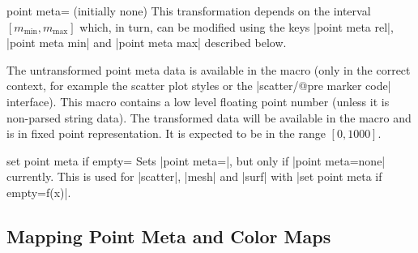 \begin{pgfplotskey}{point meta= (initially none)}
	This transformation depends on the interval $[m_{\text{min}},m_{\text{max}}]$ which, in turn, can be modified using the keys |point meta rel|, |point meta min| and |point meta max| described below.

	The untransformed point meta data is available in the macro \declareandlabel{\pgfplotspointmeta} (only in the correct context, for example the scatter plot styles or the |scatter/@pre marker code| interface). This macro contains a low level floating point number (unless it is non-parsed string data). The transformed data will be available in the macro \declareandlabel{\pgfplotspointmetatransformed} and is in fixed point representation. It is expected to be in the range $[0,1000]$.

\end{pgfplotskey}

\begin{pgfplotskey}{set point meta if empty=}
	Sets |point meta=|, but only if |point meta=none| currently. This is used for |scatter|, |mesh| and |surf| with |set point meta if empty=f(x)|.
\end{pgfplotskey}

\subsection{Mapping Point Meta and Color Maps}


